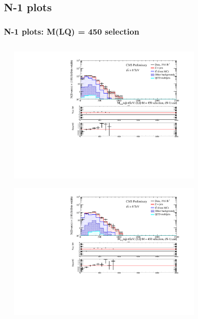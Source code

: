 \documentclass[bigger]{beamer}
\begin{document}
\subsection{\eejj N-1 plots}
\label{sec-1-12}
\begin{frame}
\frametitle{\eejj N-1 plots: M(LQ) = 450 selection}
\label{sec-1-12-1}
\begin{columns} %
\label{sec-1-12-1-1}
\begin{column}{0.55\textwidth}
\label{sec-1-12-1-1-1}
\label{sec-1-12-1-1-1-1}

\centering
\includegraphics[width=0.8\textwidth]{fig/ee/nMinus1/Mej_selected_min_StAndMeeLQ450_eejj.pdf}
\label{sec-1-12-1-1-1-2}

\centering
\includegraphics[width=0.8\textwidth]{fig/ee/nMinus1/Mej_selected_avg_StAndMeeLQ450_eejj.pdf}
\end{column}
\begin{column}{0.55\textwidth}
\label{sec-1-12-1-1-2}
\label{sec-1-12-1-1-2-1}


\end{column}
\end{columns}
\end{frame}
\end{document}
